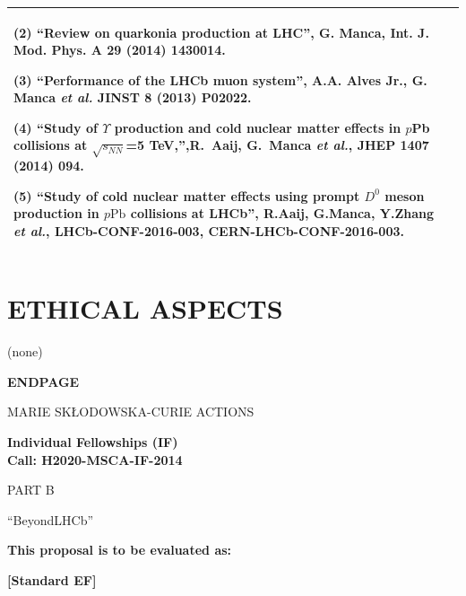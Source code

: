 \documentclass[a4paper,11pt]{article}
\newcommand{\acronym}{{\sc BeyondLHCb}\xspace} %
\begin{document}
{\begin{tabular}{>{\raggedright}p{}p{}}
(2) “Review on quarkonia production at LHC”, G. Manca, Int. J. Mod. Phys. A {\bf 29} (2014) 1430014.

(3) “Performance of the LHCb muon system”, A.A. Alves Jr., G. Manca {\it et al.} JINST {\bf 8} (2013) P02022.

(4) ``Study of $\Upsilon$ production and cold nuclear matter effects in $p$Pb collisions at $\sqrt{s_{NN}}$=5 TeV,'',R.~Aaij, G.~Manca {\it et al.}, JHEP {\bf 1407} (2014) 094.

(5) ``Study of cold nuclear matter effects using prompt $D^0$ meson production in $p\mathrm{Pb}$ collisions at LHCb'', R.Aaij, G.Manca, Y.Zhang {\it et al.},  LHCb-CONF-2016-003, CERN-LHCb-CONF-2016-003.
\\\bottomrule
\end{tabular}
}
\vspace{\baselineskip}


\section{ETHICAL ASPECTS}

(none)


\newpage
\vspace{15mm}
\begin{center}


        \Large{
      
     
        \textbf{ENDPAGE}
  
          \vspace{15mm}
          MARIE SKŁODOWSKA-CURIE ACTIONS\\
          \vspace{1cm}
          
          \textbf{Individual Fellowships (IF)}\\
          \textbf{Call: H2020-MSCA-IF-2014}
          \vspace{2cm}                   

          PART B
          \vspace{2.5cm}

          ``\acronym''
          \vspace{2cm}

          \textbf{This proposal is to be evaluated as:}
          \vspace{.5cm}

          \textbf{[Standard EF]}
        }

  \end{center}
\vspace{1cm}
\end{document}
